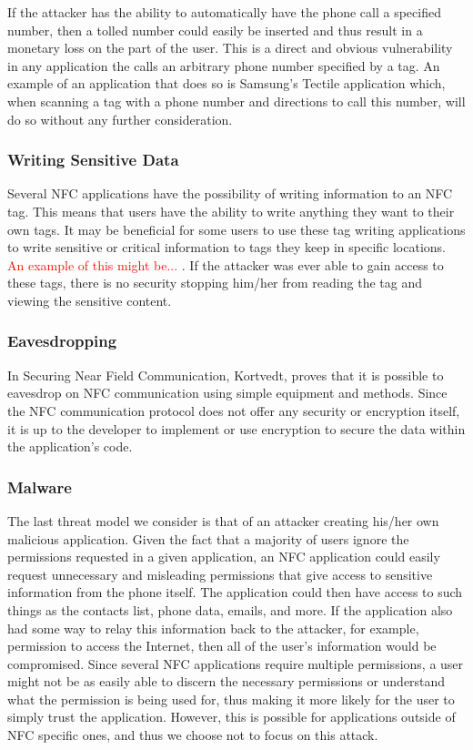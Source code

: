 \documentclass[12pt]{article}
\newcommand\TODO[1]{\textcolor{red}{#1}}
\begin{document}
If the attacker has the ability to automatically have the phone call a specified number, then a tolled number could easily be inserted and thus result in a monetary loss on the part of the user. This is a direct and obvious vulnerability in any application the calls an arbitrary phone number specified by a tag. An example of an application that does so is Samsung's Tectile application which, when scanning a tag with a phone number and directions to call this number, will do so without any further consideration. 

\subsubsection{Writing Sensitive Data}
Several NFC applications have the possibility of writing information to an NFC tag. This means that users have the ability to write anything they want to their own tags. It may be beneficial for some users to use these tag writing applications to write sensitive or critical information to tags they keep in specific locations. \TODO{An example of this might be... }. If the attacker was ever able to gain access to these tags, there is no security stopping him/her from reading the tag and viewing the sensitive content. 

\subsubsection{Eavesdropping}
In Securing Near Field Communication, Kortvedt, proves that it is possible to eavesdrop on NFC communication using simple equipment and methods. Since the NFC communication protocol does not offer any security or encryption itself, it is up to the developer to implement or use encryption to secure the data within the application's code. 

\subsubsection{Malware}
The last threat model we consider is that of an attacker creating his/her own malicious application. Given the fact that a majority of users ignore the permissions requested in a given application, an NFC application could easily request unnecessary and misleading permissions that give access to sensitive information from the phone itself. The application could then have access to such things as the contacts list, phone data, emails, and more. If the application also had some way to relay this information back to the attacker, for example, permission to access the Internet, then all of the user's information would be compromised. Since several NFC applications require multiple permissions, a user might not be as easily able to discern the necessary permissions or understand what the permission is being used for, thus making it more likely for the user to simply trust the application. However, this is possible for applications outside of NFC specific ones, and thus we choose not to focus on this attack. 
\end{document}
